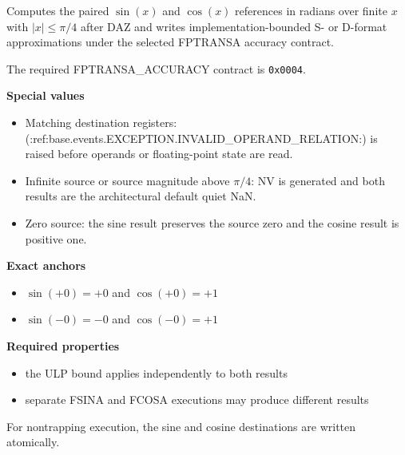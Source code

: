 Computes the paired $\sin(x)$ and $\cos(x)$ references in radians over finite $x$ with $|x| \le \pi/4$ after DAZ and writes implementation-bounded S- or D-format approximations under the selected FPTRANSA accuracy contract.

The required FPTRANSA\_ACCURACY contract is \texttt{0x0004}.

\textbf{Special values}\par
\begin{itemize}
\item Matching destination registers: (:ref:base.events.EXCEPTION.INVALID_OPERAND_RELATION:) is raised before operands or floating-point state are read.
\item Infinite source or source magnitude above $\pi/4$: NV is generated and both results are the architectural default quiet NaN.
\item Zero source: the sine result preserves the source zero and the cosine result is positive one.
\end{itemize}

\textbf{Exact anchors}\par
\begin{itemize}
\item $\sin(+0) = +0$ and $\cos(+0) = +1$
\item $\sin(-0) = -0$ and $\cos(-0) = +1$
\end{itemize}

\textbf{Required properties}\par
\begin{itemize}
\item the ULP bound applies independently to both results
\item separate FSINA and FCOSA executions may produce different results
\end{itemize}

For nontrapping execution, the sine and cosine destinations are written atomically.

